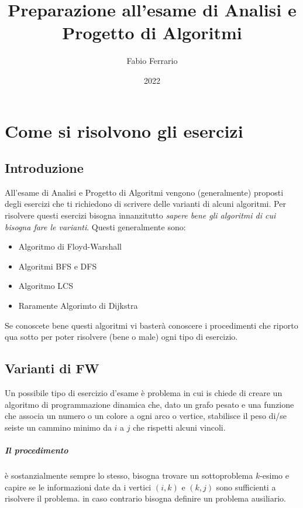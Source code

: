\documentclass[12pt, a4paper, openany]{book}
\begin{document}
\title{Preparazione all'esame di Analisi e Progetto di Algoritmi}
\author{Fabio Ferrario}
\date{2022}
\maketitle
\tableofcontents

\chapter{Come si risolvono gli esercizi}
\section{Introduzione}
All'esame di Analisi e Progetto di Algoritmi vengono (generalmente) proposti degli esercizi che ti richiedono di scrivere delle varianti di alcuni algoritmi.
Per risolvere questi esercizi bisogna innanzitutto \emph{sapere bene gli algoritmi di cui bisogna fare le varianti}.
Questi generalmente sono:
\begin{itemize}
	\item Algoritmo di Floyd-Warshall
	\item Algoritmi BFS e DFS
	\item Algoritmo LCS
	\item Raramente Algorimto di Dijkstra
\end{itemize}
Se conoscete bene questi algoritmi vi basterà conoscere i procedimenti che riporto qua sotto per poter risolvere (bene o male) ogni tipo di esercizio.

\section{Varianti di FW}
Un possibile tipo di esercizio d'esame è problema in cui is chiede di creare un algoritmo di programmazione dinamica
che, dato un grafo pesato e una funzione che associa un numero o un colore a ogni arco o vertice, stabilisce {il peso di}/{se seiste} un cammino minimo da $i$ a $j$
che rispetti alcuni vincoli.

\paragraph{Il procedimento}è sostanzialmente sempre lo stesso, bisogna trovare un sottoproblema $k$-esimo e capire se le informazioni date da i vertici $(i,k)$ e $(k,j)$
sono sufficienti a risolvere il problema. in caso contrario bisogna definire un problema ausiliario.
\end{document}
